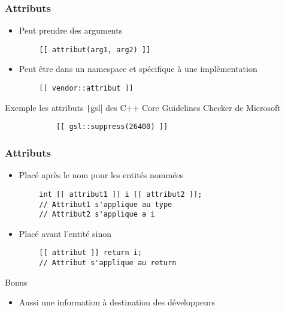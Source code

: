 \documentclass[C++.tex]{subfiles}
\begin{document}
\begin{frame}[fragile]
	\frametitle{Attributs}
	\begin{itemize}
		\item Peut prendre des arguments
	\end{itemize}

	\begin{verbatim}
		[[ attribut(arg1, arg2) ]]
	\end{verbatim}

	\begin{itemize}
		\item Peut être dans un namespace et spécifique à une implémentation
	\end{itemize}

	\begin{verbatim}
		[[ vendor::attribut ]]
	\end{verbatim}

	\begin{block}{Exemple}
		les attributs \texttt|gsl| des \og C++ Core Guidelines Checker\fg{} de Microsoft

		\begin{verbatim}
			[[ gsl::suppress(26400) ]]
		\end{verbatim}
	\end{block}
\end{frame}

\begin{frame}[fragile]
	\frametitle{Attributs}
	\begin{itemize}
		\item Placé après le nom pour les entités nommées
	\end{itemize}

	\begin{verbatim}
		int [[ attribut1 ]] i [[ attribut2 ]];
		// Attribut1 s'applique au type
		// Attribut2 s'applique a i
	\end{verbatim}

	\begin{itemize}
		\item Placé avant l'entité sinon
	\end{itemize}

	\begin{verbatim}
		[[ attribut ]] return i;
		// Attribut s'applique au return
	\end{verbatim}

	\begin{exampleblock}{Bonus}
		\begin{itemize}
			\item Aussi une information à destination des développeurs
		\end{itemize}
	\end{exampleblock}
\end{frame}
\end{document}
